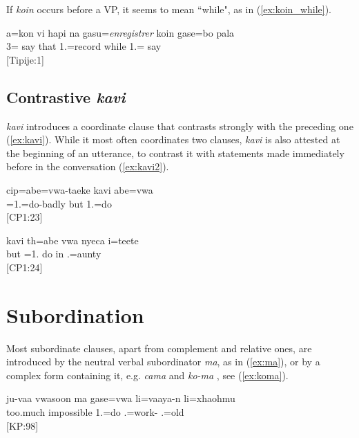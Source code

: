 If \textit{koin} occurs before a VP, it seems to mean ``while", as in (\ref{ex:koin_while}). 

\ea \label{ex:koin_while}\gll a=kon vi hapi na gasu=\textit{enregistrer} koin gase=bo pala \\
 3= say that  1.=record while 1.= say \\
\glt  {} {[Tipije:1]}
\z 

\subsection{Contrastive \textit{kavi}}
\textit{kavi}  introduces a coordinate clause that contrasts strongly with the preceding one (\ref{ex:kavi}). While it most often coordinates two clauses, \textit{kavi} is also attested at the beginning of an utterance, to contrast it with statements made immediately before in the conversation (\ref{ex:kavi2}).

\ea \label{ex:kavi}\gll  cip=abe=vwa-taeke {kavi} abe=vwa \\
  =1.=do-badly but 1.=do\\
\glt {} {[CP1:23]}
\z

\ea\label{ex:kavi2}
\gll kavi th=abe vwa nyeca i=teete \\
 but =1. do in .=aunty\\
\glt {} {[CP1:24]}
\z

\section{Subordination}
\label{sec:subr}
Most subordinate clauses, apart from complement and relative ones, are introduced by the neutral verbal subordinator \textit{ma}, as in (\ref{ex:ma}), or by a complex form containing it, e.g. \textit{cama}  and \textit{ko-ma} , see (\ref{ex:koma}).


\ea\label{ex:ma}\gll ju-vaa vwasoon ma gase=vwa li=vaaya-n li=xhaohmu\\
 too.much impossible  1.=do .=work- .=old\\
\glt {} {[KP:98]}
\z


